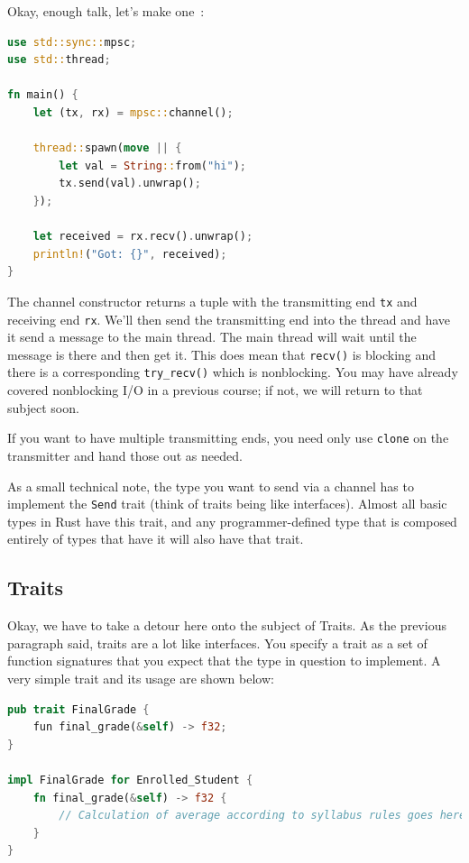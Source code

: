 Okay, enough talk, let's make one~\cite{rustdocs}:
\begin{lstlisting}[language=Rust]
use std::sync::mpsc;
use std::thread;

fn main() {
    let (tx, rx) = mpsc::channel();

    thread::spawn(move || {
        let val = String::from("hi");
        tx.send(val).unwrap();
    });

    let received = rx.recv().unwrap();
    println!("Got: {}", received);
}
\end{lstlisting}

The channel constructor returns a tuple with the transmitting end \texttt{tx} and receiving end \texttt{rx}. We'll then send the transmitting end into the thread and have it send a message to the main thread. The main thread will wait until the message is there and then get it. This does mean that \texttt{recv()} is blocking and there is a corresponding \texttt{try\_recv()} which is nonblocking. You may have already covered nonblocking I/O in a previous course; if not, we will return to that subject soon.

If you want to have multiple transmitting ends, you need only use \texttt{clone} on the transmitter and hand those out as needed. 

As a small technical note, the type you want to send via a channel has to implement the \texttt{Send} trait (think of traits being like interfaces). Almost all basic types in Rust have this trait, and any programmer-defined type that is composed entirely of types that have it will also have that trait.  


\subsection*{Traits}
Okay, we have to take a detour here onto the subject of Traits. As the previous paragraph said, traits are a lot like interfaces. You specify a trait as a set of function signatures that you expect that the type in question to implement. A very simple trait and its usage are shown below:

\begin{lstlisting}[language=Rust]
pub trait FinalGrade {
	fun final_grade(&self) -> f32;
}

impl FinalGrade for Enrolled_Student {
    fn final_grade(&self) -> f32 {
        // Calculation of average according to syllabus rules goes here
    }	
}  
\end{lstlisting}

